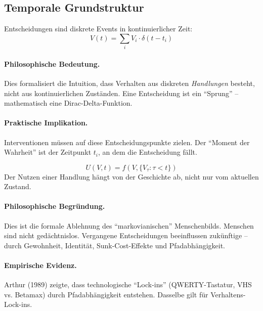 \subsection{Temporale Grundstruktur}

\begin{axiom}
Entscheidungen sind diskrete Events in kontinuierlicher Zeit:
\begin{equation}
V(t) = \sum_i V_i \cdot \delta(t - t_i)
\end{equation}

\paragraph{Philosophische Bedeutung.}
Dies formalisiert die Intuition, dass Verhalten aus diskreten \textit{Handlungen} besteht, nicht aus kontinuierlichen Zuständen. Eine Entscheidung ist ein ``Sprung'' -- mathematisch eine Dirac-Delta-Funktion.

\paragraph{Praktische Implikation.}
Interventionen müssen auf diese Entscheidungspunkte zielen. Der ``Moment der Wahrheit'' ist der Zeitpunkt $t_i$, an dem die Entscheidung fällt.
\end{axiom}

\begin{axiom}
\begin{equation}
U(V, t) = f(V, \{V_\tau : \tau < t\})
\end{equation}
Der Nutzen einer Handlung hängt von der Geschichte ab, nicht nur vom aktuellen Zustand.

\paragraph{Philosophische Begründung.}
Dies ist die formale Ablehnung des ``markovianischen'' Menschenbilds. Menschen sind nicht gedächtnislos. Vergangene Entscheidungen beeinflussen zukünftige -- durch Gewohnheit, Identität, Sunk-Cost-Effekte und Pfadabhängigkeit.

\paragraph{Empirische Evidenz.}
Arthur (1989) zeigte, dass technologische ``Lock-ins'' (QWERTY-Tastatur, VHS vs. Betamax) durch Pfadabhängigkeit entstehen. Dasselbe gilt für Verhaltens-Lock-ins.
\end{axiom}

